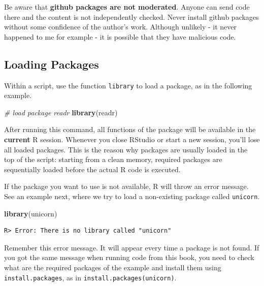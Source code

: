\documentclass[
  12pt,
]{book}
\newenvironment{Shaded}{\begin{snugshade}}{\end{snugshade}}
\newcommand{\CommentTok}[1]{\textcolor[rgb]{0.37,0.37,0.37}{\textit{#1}}}
\newcommand{\KeywordTok}[1]{\textcolor[rgb]{0.27,0.27,0.27}{\textbf{#1}}}
\newcommand{\NormalTok}[1]{#1}
\newenvironment{rmdcaution}
{\begin{cautionblock}
		
	} {\end{cautionblock}}
\begin{document}
\begin{rmdcaution}
Be aware that \textbf{github packages are not moderated}. Anyone can
send code there and the content is not independently checked. Never
install github packages without some confidence of the author's work.
Although unlikely - it never happened to me for example - it is possible
that they have malicious code.
\end{rmdcaution}

\hypertarget{loading-packages}{%
\subsection{Loading Packages}\label{loading-packages}}

Within a script, use the function \texttt{library} to load a package, as in the following example. 

\begin{Shaded}
\begin{Highlighting}[]
\CommentTok{# load package readr}
\KeywordTok{library}\NormalTok{(readr)}
\end{Highlighting}
\end{Shaded}

After running this command, all functions of the package will be available in the \textbf{current} R session. Whenever you close RStudio or start a new session, you'll lose all loaded packages. This is the reason why packages are usually loaded in the top of the script: starting from a clean memory, required packages are sequentially loaded before the actual R code is executed.

If the package you want to use is not available, R will throw an error message. See an example next, where we try to load a non-existing package called \texttt{unicorn}.

\begin{Shaded}
\begin{Highlighting}[]
\KeywordTok{library}\NormalTok{(unicorn)}
\end{Highlighting}
\end{Shaded}

\begin{verbatim}
R> Error: There is no library called "unicorn"
\end{verbatim}

Remember this error message. It will appear every time a package is not found. If you got the same message when running code from this book, you need to check what are the required packages of the example and install them using \texttt{install.packages}, as in \texttt{install.packages(\textquotesingle{}unicorn\textquotesingle{})}.
\end{document}

